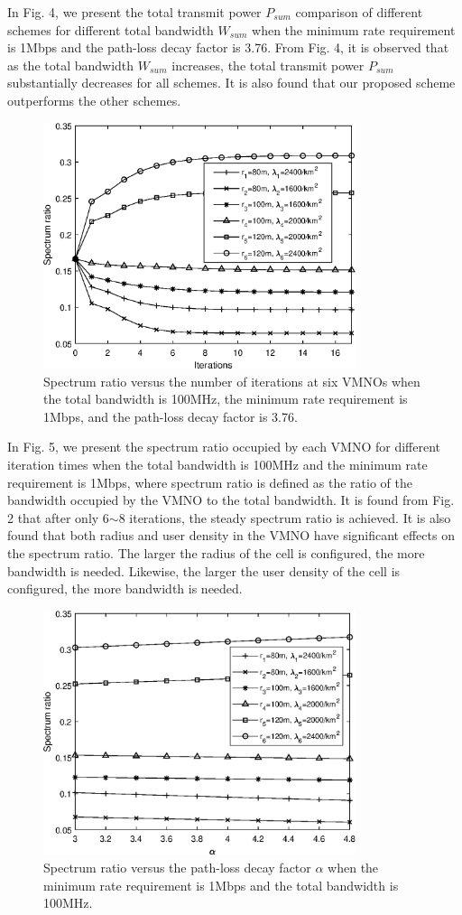 \documentclass[journal]{IEEEtran}
\begin{document}
In Fig. 4, we present the total transmit power $P_{sum}$ comparison of different schemes for different total bandwidth $W_{sum}$ when the minimum rate requirement is 1Mbps and the path-loss decay factor is 3.76. From Fig. 4, it is observed that as the total bandwidth $W_{sum}$ increases, the total transmit power $P_{sum}$ substantially decreases for all schemes. It is also found that our proposed scheme outperforms the other schemes.

\begin{figure}
	\centering
	\includegraphics[width=3.6in]{SR_convergence.eps}
	\caption{Spectrum ratio versus the number of iterations at six VMNOs when the total bandwidth is 100MHz, the minimum rate requirement is 1Mbps, and the path-loss decay factor is 3.76.}
\end{figure}

In Fig. 5, we present the spectrum ratio occupied by each VMNO for different iteration times when the total bandwidth is 100MHz and the minimum rate requirement is 1Mbps, where spectrum ratio is defined as the ratio of the bandwidth occupied by the VMNO to the total bandwidth.  It is found from Fig. 2 that after only 6$\sim$8 iterations, the steady spectrum ratio is achieved. It is also found that both radius and user density in the VMNO have significant effects on the spectrum ratio. The larger the radius of the cell is configured, the more bandwidth is needed. Likewise, the larger the user density of the cell is configured, the more bandwidth is needed. 


\begin{figure}
	\centering
	\includegraphics[width=3.6in]{SR_alpha.eps}
	\caption{Spectrum ratio versus the path-loss decay factor $\alpha$ when the minimum rate requirement is 1Mbps and the total bandwidth is 100MHz.}
\end{figure}
\end{document}

